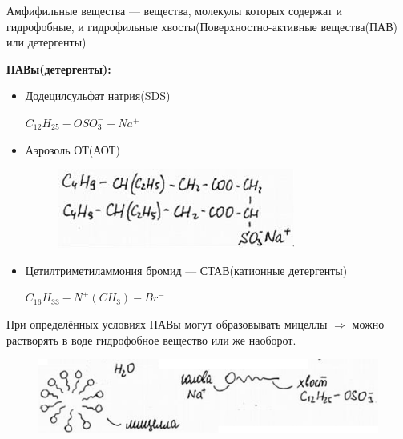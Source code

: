 \begin{lecture}[Седьмая]
	\begin{lecSection}
	\begin{flushleft}
		\begin{definition}
		Амфифильные вещества --- вещества, молекулы которых содержат и гидрофобные, и гидрофильные хвосты(Поверхностно-активные вещества(ПАВ) или детергенты)
		\end{definition}
	\par \textbf{ПАВы(детергенты):}
		\begin{itemize}
			\item Додецилсульфат натрия(SDS)
				\par $C_{12}H_{25}-OSO_3^--Na^+$
			\item Аэрозоль ОТ(АОТ)
				\begin{figure}[H]
				\begin{minipage}[h]{0.5\linewidth}
					\centering\includegraphics[width=\linewidth]{lecture_07/pic5}
				\end{minipage}
				\hfill
				\end{figure}
			\item Цетилтриметиламмония бромид — СТАВ(катионные детергенты)
				\par $C_{16}H_{33}-N^+(CH_3)-Br^-$
		\end{itemize}
		\par При определённых условиях ПАВы могут образовывать мицеллы $\Rightarrow$ можно растворять в воде гидрофобное вещество или же наоборот.
			\begin{figure}[H]
			\begin{minipage}[h]{0.7\linewidth}
				\centering\includegraphics[width=\linewidth]{lecture_07/pic6}
			\end{minipage}
			\hfill
			\end{figure}
	

\end{flushleft}
\end{lecSection}
\end{lecture}
